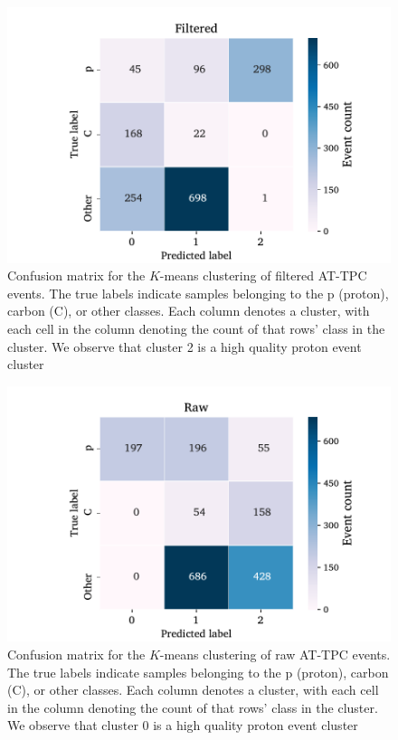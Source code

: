\documentclass[review,sort&compress]{elsarticle}
\begin{document}
\begin{figure}
\centering
	\includegraphics[width=\textwidth]{custom_work/Filteredvgg_conf_mat.pdf}
	\caption[Pre-trained network - confusion matrices]{Confusion matrix for the $K$-means clustering of filtered AT-TPC events. The true labels indicate samples belonging to the p (proton), carbon (C), or other classes. Each column denotes a cluster, with each cell in the column denoting the count of that rows' class in the cluster. We observe that cluster 2 is a high quality proton event cluster }\label{fig:clster_confmati_filt}
\end{figure}

\begin{figure}
	\includegraphics[width=\textwidth]{custom_work/Rawvgg_conf_mat.pdf}
\caption[Pre-trained network - confusion matrices]{Confusion matrix for the $K$-means clustering of raw AT-TPC events. The true labels indicate samples belonging to the p (proton), carbon (C), or other classes. Each column denotes a cluster, with each cell in the column denoting the count of that rows' class in the cluster. We observe that cluster 0 is a high quality proton event cluster }\label{fig:clster_confmati_raw}
\end{figure}
\end{document}
